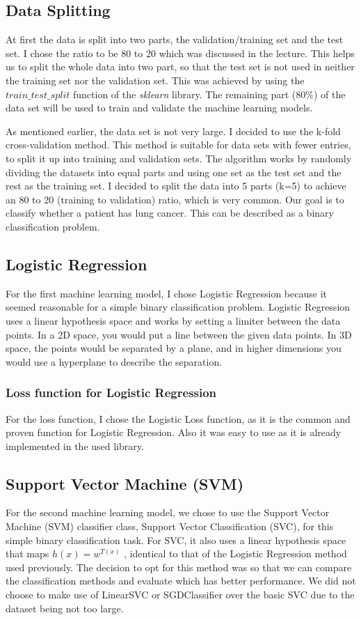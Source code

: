 \documentclass[a4paper,12pt]{article}
\begin{document}
\subsection{Data Splitting}
\label{sec:orgd2f215b}
At first the data is split into two parts, the validation/training set and the test set. I chose the ratio to be 80 to 20 which was discussed in the lecture.
This helps us to split the whole data into two part, so that the test set is not used in neither the training set nor the validation set.
This was achieved by using the \(train\_test\_split\) function of the \emph{sklearn} library.
The remaining part (80\%) of the data set will be used to train and validate the machine learning models.

As mentioned earlier, the data set is not very large.
I decided to use the k-fold cross-validation method. This method is suitable for data sets with fewer entries, to split it up into training and validation sets.
The algorithm works by randomly dividing the datasets into equal parts and using one set as the test set and the rest as the training set.
I decided to split the data into 5 parts (k=5) to achieve an 80 to 20 (training to validation) ratio, which is very common.
Our goal is to classify whether a patient has lung cancer. This can be described as a binary classification problem.

\subsection{Logistic Regression}
\label{sec:orgec5508c}
For the first machine learning model, I chose Logistic Regression because it seemed reasonable for a simple binary classification problem.
Logistic Regression uses a linear hypothesis space and works by setting a limiter between the data points.
In a 2D space, you would put a line between the given data points. In 3D space, the points would be separated by a plane, and in higher dimensions you would use a hyperplane to describe the separation.

\subsubsection{Loss function for Logistic Regression}
\label{sec:orgd9dc3b0}
For the loss function, I chose the Logistic Loss function, as it is the common and proven function for Logistic Regression. Also it was easy to use as it is already implemented in the used library.

\subsection{Support Vector Machine (SVM)}
\label{sec:orgd54725b}
For the second machine learning model, we chose to use the Support Vector Machine (SVM) classifier class, Support Vector Classification (SVC), for this simple binary classification task. For SVC, it also uses a linear hypothesis space that maps \(h(x) = w^{T(x)}\) , identical to that of the Logistic Regression method used previously. The decision to opt for this method was so that we can compare the classification methods and evaluate which has better performance. We did not choose to make use of LinearSVC or SGDClassifier over the basic SVC due to the dataset being not too large.
\end{document}
